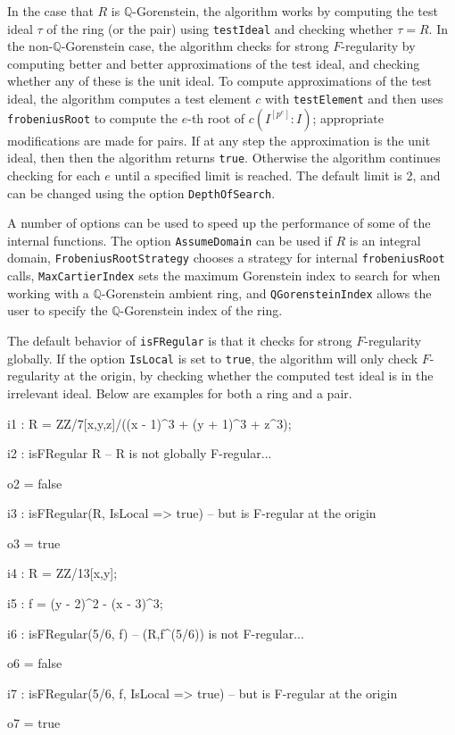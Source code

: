 \documentclass{amsart}
\begin{document}
In the case that $R$ is $\mathbb{Q}$-Gorenstein, the algorithm works by
computing the test ideal $\tau$ of the ring  (or the pair) using \texttt{testIdeal}
and checking whether $\tau=R$.
In the non-$\mathbb{Q}$-Gorenstein case, the algorithm checks for
strong $F$-regularity by computing better and
better approximations of the test ideal, and checking whether any of these is the unit ideal.
To compute approximations of the
test ideal, the algorithm computes a test element $c$ with \texttt{testElement}
and then uses \texttt{frobeniusRoot} to compute the $e$-th root of
$c(I^{[p^{e}]} : I)$; appropriate modifications are made for pairs. If at
any step the approximation is the unit ideal, then then the algorithm
returns \texttt{true}. Otherwise the algorithm continues checking for each $e$
until a specified limit is reached. The default limit is 2, and can be
changed using the option \texttt{DepthOfSearch}.


A number of options can be used to speed up the performance of some of the
internal functions. The option \texttt{AssumeDomain} can be used if $R$ is an
integral domain, \texttt{FrobeniusRootStrategy} chooses a strategy for
internal \texttt{frobeniusRoot} calls, \texttt{MaxCartierIndex} sets the
maximum Gorenstein index to search for when working with a
$\mathbb{Q}$-Gorenstein ambient ring, and \texttt{QGorensteinIndex}
allows the user to specify the $\mathbb{Q}$-Gorenstein index of the ring.


The default behavior of \texttt{isFRegular} is that it checks for strong $F$-regularity
globally. If the option \texttt{IsLocal} is set to \texttt{true}, the algorithm will only
check $F$-regularity at the origin, by checking whether the computed test ideal is in the irrelevant ideal.
Below are examples for both a ring and a pair.


\medskip
{\small{}
\begin{MyVerbatim}
i1 : R = ZZ/7[x,y,z]/((x - 1)^3 + (y + 1)^3 + z^3);

i2 : isFRegular R -- R is not globally F-regular...

o2 = false

i3 : isFRegular(R, IsLocal => true) -- but is F-regular at the origin

o3 = true

i4 : R = ZZ/13[x,y];

i5 : f = (y - 2)^2 - (x - 3)^3;

i6 : isFRegular(5/6, f) -- (R,f^(5/6)) is not F-regular...

o6 = false

i7 : isFRegular(5/6, f, IsLocal => true) -- but is F-regular at the origin

o7 = true
\end{MyVerbatim}
}\medskip
\end{document}
